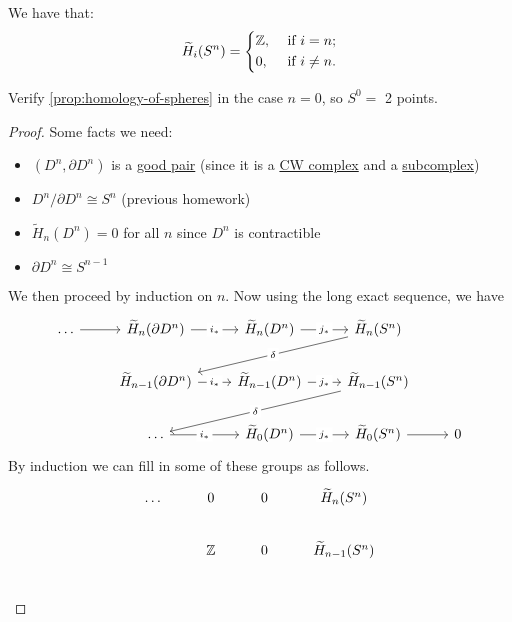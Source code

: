 \begin{proposition}\label{prop:homology-of-spheres}
	We have that:
	\[
		\widetilde{H}_i(S^n) = \begin{dcases}
			\mathbb{\MakeUppercase{z}} , & \text{ if } i = n ;    \\
			0,                           & \text{ if } i \neq n .
		\end{dcases}
	\]
\end{proposition}
\begin{exercise}
	Verify \autoref{prop:homology-of-spheres} in the case $n = 0$, so $S^0 = $ 2 points.
\end{exercise}
\begin{proof}
	Some facts we need:
	\begin{itemize}
		\item $(D^n, \partial D^n)$ is a \hyperref[def:good-pair]{good pair} (since it is a \hyperref[def:CW-Complex]{CW complex} and a \hyperref[def:CW-subcomplex]{subcomplex})
		\item $D^n /\partial D^n \cong S^n$ (previous homework)
		\item $\widetilde{H}_n(D^n) = 0$ for all $n$ since $D^n$ is contractible
		\item $\partial D^n \cong S^{n - 1}$
	\end{itemize}
	We then proceed by induction on $n$. Now using the long exact sequence, we have
	\[\begin{tikzcd}
			\ldots & {\widetilde{H}_n(\partial D^n)} & {\widetilde{H}_n(D^n)} & {\widetilde{H}_n(S^n)} \\
			& {\widetilde{H}_{n-1}(\partial D^n)} & {\widetilde{H}_{n-1}(D^n)} & {\widetilde{H}_{n-1}(S^n)} \\
			& \ldots & {\widetilde{H}_{0}(D^n)} & {\widetilde{H}_{0}(S^n)} & 0
			\arrow["{j_\ast}"{description}, from=1-3, to=1-4]
			\arrow["{j_\ast}"{description}, from=2-3, to=2-4]
			\arrow[from=3-4, to=3-5]
			\arrow["{i_\ast}"{description}, from=2-2, to=2-3]
			\arrow["{i_\ast}"{description}, from=1-2, to=1-3]
			\arrow[from=1-1, to=1-2]
			\arrow["\delta"{description}, from=1-4, to=2-2]
			\arrow["\delta"{description}, from=2-4, to=3-2]
			\arrow["{j_\ast}"{description}, from=3-3, to=3-4]
			\arrow["{i_\ast}"{description}, from=3-2, to=3-3]
		\end{tikzcd}\]
	By induction we can fill in some of these groups as follows.
	\[\begin{tikzcd}
			\ldots & {0} & {0} & {\widetilde{H}_n(S^n)} \\
			& {\mathbb{\MakeUppercase{z}} } & {0} & {\widetilde{H}_{n-1}(S^n)} \\

\end{tikzcd}\]
\end{proof}

